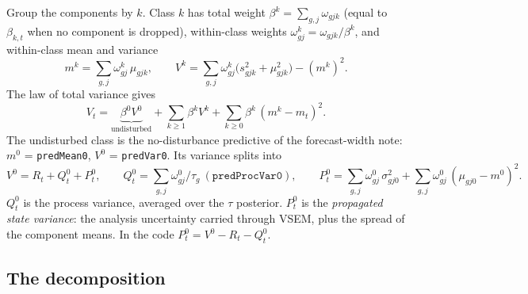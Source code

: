 \documentclass[11pt]{article}
\newcommand{\code}[1]{\texttt{#1}}
\begin{document}
Group the components by $k$. Class $k$ has total weight $\beta^k = \sum_{g,j}\omega_{gjk}$
(equal to $\beta_{k,t}$ when no component is dropped), within-class weights
$\omega^k_{gj} = \omega_{gjk}/\beta^k$, and within-class mean and variance
\[
  m^k = \sum_{g,j}\omega^k_{gj}\,\mu_{gjk}, \qquad
  V^k = \sum_{g,j}\omega^k_{gj}\big(s^2_{gjk} + \mu^2_{gjk}\big) - (m^k)^2 .
\]
The law of total variance gives
\begin{equation}
  V_t = \underbrace{\beta^0 V^0}_{\text{undisturbed}}
      + \sum_{k \ge 1}\beta^k V^k
      + \sum_{k \ge 0}\beta^k\,(m^k - m_t)^2 .
  \label{eq:ltv}
\end{equation}
The undisturbed class is the no-disturbance predictive of the forecast-width note:
$m^0$ = \code{predMean0}, $V^0$ = \code{predVar0}. Its variance splits into
\begin{equation}
  V^0 = R_t + Q^0_t + P^0_t, \qquad
  Q^0_t = \sum_{g,j}\omega^0_{gj}/\tau_g \ (\code{predProcVar0}), \qquad
  P^0_t = \sum_{g,j}\omega^0_{gj}\,\sigma^2_{gj0} + \sum_{g,j}\omega^0_{gj}\,(\mu_{gj0} - m^0)^2 .
  \label{eq:V0}
\end{equation}
$Q^0_t$ is the process variance, averaged over the $\tau$ posterior. $P^0_t$ is the
\emph{propagated state variance}: the analysis uncertainty carried through VSEM, plus the
spread of the component means. In the code $P^0_t = V^0 - R_t - Q^0_t$.

\subsection{The decomposition}
\end{document}
